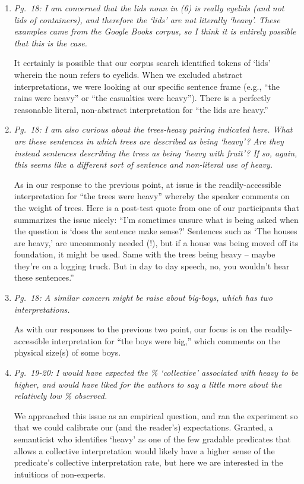 \documentclass[12pt]{article}
\begin{document}
\begin{enumerate}
\item \emph{Pg.~18: I am concerned that the \emph{lids} noun in (6) is really eyelids (and not lids of containers), and therefore the `lids' are not literally ‘heavy’. These examples came from the Google Books corpus, so I think it is entirely possible that this is the case.}

It certainly is possible that our corpus search identified tokens of `lids' wherein the noun refers to eyelids. When we excluded abstract interpretations, we were looking at our specific sentence frame (e.g., ``the rains were heavy'' or ``the casualties were heavy''). There is a perfectly reasonable literal, non-abstract interpretation for ``the lids are heavy.'' 

\item \emph{Pg.~18: I am also curious about the \emph{trees-heavy} pairing indicated here. What are these sentences in which trees are described as being `heavy'? Are they instead sentences describing the trees as being `heavy with fruit'? If so, again, this seems like a different sort of sentence and non-literal use of heavy.}

As in our response to the previous point, at issue is the readily-accessible interpretation for ``the trees were heavy'' whereby the speaker comments on the weight of trees. Here is a post-test quote from one of our participants that summarizes the issue nicely: ``I'm sometimes unsure what is being asked when the question is `does the sentence make sense?'  Sentences such as `The houses are heavy,' are uncommonly needed (!), but if a house was being moved off its foundation, it might be used.  Same with the trees being heavy -- maybe they're on a logging truck.  But in day to day speech, no, you wouldn't hear these sentences.''

\item \emph{Pg.~18: A similar concern might be raise about \emph{big-boys}, which has two interpretations.}

As with our responses to the previous two point, our focus is on the readily-accessible interpretation for ``the boys were big,'' which comments on the physical size(s) of some boys.

\item \emph{Pg.~19-20: I would have expected the \% `collective' associated with \emph{heavy} to be higher, and would have liked for the authors to say a little more about the relatively low \% observed.}

We approached this issue as an empirical question, and ran the experiment so that we could calibrate our (and the reader's) expectations. Granted, a semanticist who identifies `heavy' as one of the few gradable predicates that allows a collective interpretation would likely have a higher sense of the predicate's collective interpretation rate, but here we are interested in the intuitions of non-experts.
	

\end{enumerate}
\end{document}
